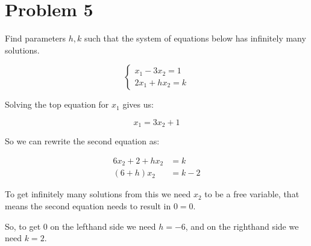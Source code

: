 \section*{Problem 5}

Find parameters $h, k$ such that the system of equations below has infinitely many solutions.

\[
	\begin{cases}
		x_1 - 3x_2 = 1 \\
		2x_1 + hx_2 = k
	\end{cases}
\]

Solving the top equation for $x_1$ gives us:

\[x_1 = 3x_2 + 1\]

So we can rewrite the second equation as:

\[
	\begin{aligned}
		6x_2 + 2 + hx_2 &= k \\
		(6 + h)x_2 &= k-2
	\end{aligned}
\]

To get infinitely many solutions from this we need $x_2$ to be a free variable, that means the second equation needs to result in $0 = 0$.

So, to get 0 on the lefthand side we need $h = -6$, and on the righthand side we need $k = 2$.
